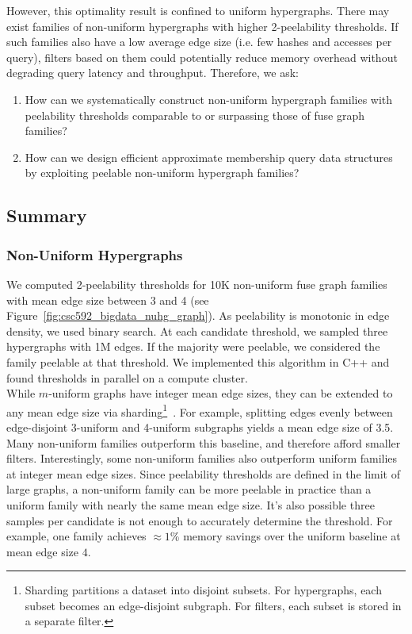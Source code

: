 \noindent
However, this optimality result is confined to uniform hypergraphs. There may exist families of non-uniform hypergraphs with higher 2-peelability thresholds. If
such families also have a low average edge size (i.e. few hashes and accesses per query), filters based on them could potentially reduce memory overhead without
degrading query latency and throughput. Therefore, we ask:

\begin{enumerate}
    \item How can we systematically construct non-uniform hypergraph families with peelability thresholds comparable to or surpassing those of fuse graph 
    families?
    \item How can we design efficient approximate membership query data structures by exploiting peelable non-uniform hypergraph families?
\end{enumerate}

\subsection{Summary}

\subsubsection{Non-Uniform Hypergraphs}
\label{sec:nuhg}

We computed 2-peelability thresholds for 10K non-uniform fuse graph families with mean edge size between 3 and 4 (see 
Figure~\ref{fig:csc592_bigdata_nuhg_graph}). As peelability is monotonic in edge density, we used binary search. At each candidate threshold, we sampled 
three hypergraphs with 1M edges. If the majority were peelable, we considered the family peelable at that threshold. We implemented this algorithm in C++ and 
found thresholds in parallel on a compute cluster. \\



\noindent
While $m$-uniform graphs have integer mean edge sizes, they can be extended to any mean edge size via sharding\footnote{Sharding partitions a dataset into 
disjoint subsets. For hypergraphs, each subset becomes an edge-disjoint subgraph. For filters, each subset is stored in a separate filter.}~\cite{graf2022}. For
example, splitting edges evenly between edge-disjoint 3-uniform and 4-uniform subgraphs yields a mean edge size of 3.5. Many non-uniform families outperform 
this baseline, and therefore afford smaller filters. Interestingly, some non-uniform families also outperform uniform families at integer mean edge sizes. Since 
peelability thresholds are defined in the limit of large graphs, a non-uniform family can be more peelable in practice than a uniform family with nearly the 
same mean edge size. It's also possible three samples per candidate is not enough to accurately determine the threshold. For example, one family achieves 
$\approx 1$\% memory savings over the uniform baseline at mean edge size $4$. \\

